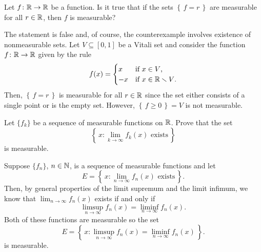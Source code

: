 \begin{problem}
  Let \(f\colon\mathbb{R}\to\mathbb{R}\) be a function. Is it true that if the sets
  \(\left\{\,f=r\,\right\}\) are measurable for all \(r\in\mathbb{R}\), then
  \(f\) is measurable?
\end{problem}
\begin{solution}
  The statement is false and, of course, the counterexample involves
  existence of nonmeasurable sets. Let \(V\subseteq[0,1]\) be a Vitali set
  and consider the function \(f\colon\mathbb{R}\to\mathbb{R}\) given by the rule
  \[
    f(x)=
    \begin{cases}
      x&\text{if \(x\in V\),}\\
      -x&\text{if \(x\in\mathbb{R}\smallsetminus V\).}
    \end{cases}
  \]
  Then, \(\left\{\,f=r\,\right\}\) is measurable for all \(r\in\mathbb{R}\) since
  the set either consists of a single point or is the empty set. However,
  \(\left\{\,f\geq 0\,\right\}=V\) is not measurable.
\end{solution}

\begin{problem}
  Let \(\{f_k\}\) be a sequence of measurable functions on \(\mathbb{R}\). Prove
  that the set
  \[
    \left\{\,x:\text{\(\lim_{k\to\infty} f_k(x)\) exists}\,\right\}
  \]
  is measurable.
\end{problem}
\begin{solution}
  Suppose \({\{f_n\}}\), \(n\in\mathbb{N}\), is a sequence of measurable
  functions and let
  \[
    E=\left\{\,x: \text{\(\lim_{n\to\infty} f_n(x)\) exists} \,\right\}.
  \]
  Then, by general properties of the limit supremum and the limit infimum,
  we know that \(\lim_{n\to\infty}f_n(x)\) exists if and only if
  \[
    \limsup_{n\to\infty}f_n(x)=\liminf_{n\to\infty}f_n(x).
  \]
  Both of these functions are measurable so the set
  \[
    E=\left\{\,x:\limsup_{n\to\infty}f_n(x)=\liminf_{n\to\infty}f_n(x)\,\right\}.
  \]
  is measurable.
\end{solution}

